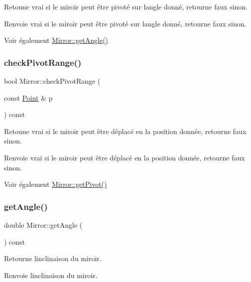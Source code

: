 Retoune vrai si le miroir peut être pivoté sur l\textquotesingle{}angle donné, retourne faux sinon. \begin{DoxyReturn}{Renvoie}
vrai si le miroir peut être pivoté sur l\textquotesingle{}angle donné, retourne faux sinon. 
\end{DoxyReturn}
\begin{DoxySeeAlso}{Voir également}
\mbox{\hyperlink{class_mirror_a940340beb2acaf99f7942615f5ef82a0}{Mirror\+::get\+Angle()}} 
\end{DoxySeeAlso}
\mbox{\label{class_mirror_ace5833b122c139bb448cf95509a681d3}} 
\subsubsection{\texorpdfstring{checkPivotRange()}{checkPivotRange()}}
{\footnotesize\ttfamily bool Mirror\+::check\+Pivot\+Range (\begin{DoxyParamCaption}\item[{const \mbox{\hyperlink{class_point}{Point}} \&}]{p }\end{DoxyParamCaption}) const}

Retoune vrai si le miroir peut être déplacé en la position donnée, retourne faux sinon. \begin{DoxyReturn}{Renvoie}
vrai si le miroir peut être déplacé en la position donnée, retourne faux sinon. 
\end{DoxyReturn}
\begin{DoxySeeAlso}{Voir également}
\mbox{\hyperlink{class_mirror_af419b1b2478e02211ff5b6369453a7ca}{Mirror\+::get\+Pivot()}} 
\end{DoxySeeAlso}
\mbox{\label{class_mirror_a940340beb2acaf99f7942615f5ef82a0}} 
\subsubsection{\texorpdfstring{getAngle()}{getAngle()}}
{\footnotesize\ttfamily double Mirror\+::get\+Angle (\begin{DoxyParamCaption}{ }\end{DoxyParamCaption}) const}

Retourne l\textquotesingle{}inclinaison du miroir. \begin{DoxyReturn}{Renvoie}
l\textquotesingle{}inclinaison du miroir. 
\end{DoxyReturn}
\mbox{\label{class_mirror_a4d36cefea10dd1853f1b26ead8f5d484}} 
